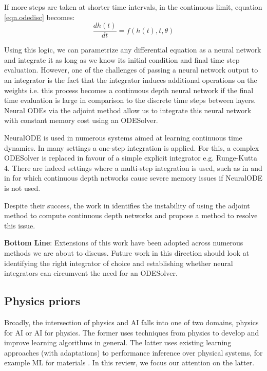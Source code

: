 \documentclass{article}
\begin{document}
If more steps are taken at shorter time intervals, in the continuous limit, equation \ref{eqn.odedisc} becomes:
\begin{equation}
\frac{dh(t)}{dt} = f(h(t),t,\theta)
\end{equation}

Using this logic, we can parametrize any differential equation as a neural network and integrate it as long as we know its initial condition and final time step evaluation. However, one of the challenges of passing a neural network output to an integrator is the fact that the integrator induces additional operations on the weights i.e. this process becomes a continuous depth neural network if the final time evaluation is large in comparison to the discrete time steps between layers. Neural ODEs via the adjoint method allow us to integrate this neural network with constant memory cost \cite{chen_neural_2018} using an ODESolver.

NeuralODE is used in numerous systems aimed at learning continuous time dynamics. In many settings a one-step integration is applied. For this, a complex ODESolver is replaced in favour of a simple explicit integrator e.g. Runge-Kutta 4. There are indeed settings where a multi-step integration is used, such as in \cite{zhong_symplectic_2019} and in \cite{saemundsson_variational_2019} for which continuous depth networks cause severe memory issues if NeuralODE is not used.

Despite their success, the work in \cite{dupont_augmented_2019} identifies the instability of using the adjoint method to compute continuous depth networks and propose a method to resolve this issue. 

\textbf{Bottom Line}: Extensions of this work have been adopted across numerous methods we are about to discuss. Future work in this direction should look at identifying the right integrator of choice and establishing whether neural integrators can circumvent the need for an ODESolver.

\subsection{Physics priors}

Broadly, the intersection of physics and AI falls into one of two domains, physics for AI or AI for physics. The former uses techniques from physics to develop and improve learning algorithms in general. The latter uses existing learning approaches (with adaptations) to performance inference over physical systems, for example ML for materials \cite{rupp_fast_2012,smith_ani-1_2017}. In this review, we focus our attention on the latter.
\end{document}
